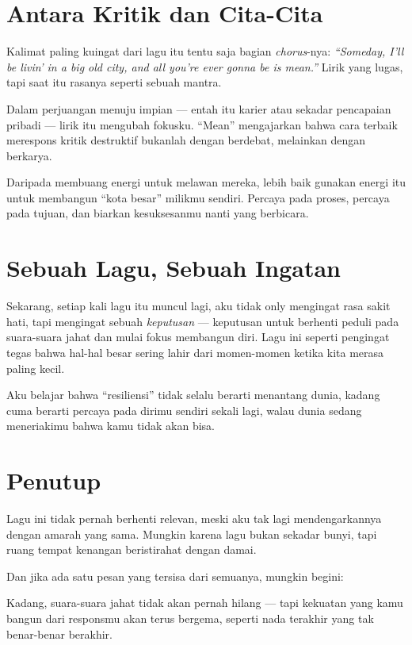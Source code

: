 \documentclass[
  letterpaper,
  DIV=11,
  numbers=noendperiod]{scrreprt}
\begin{document}
\section{Antara Kritik dan Cita-Cita}\label{antara-kritik-dan-cita-cita}

Kalimat paling kuingat dari lagu itu tentu saja bagian
\emph{chorus}-nya: \emph{``Someday, I'll be livin' in a big old city,
and all you're ever gonna be is mean.''} Lirik yang lugas, tapi saat itu
rasanya seperti sebuah mantra.

Dalam perjuangan menuju impian --- entah itu karier atau sekadar
pencapaian pribadi --- lirik itu mengubah fokusku. ``Mean'' mengajarkan
bahwa cara terbaik merespons kritik destruktif bukanlah dengan berdebat,
melainkan dengan berkarya.

Daripada membuang energi untuk melawan mereka, lebih baik gunakan energi
itu untuk membangun ``kota besar'' milikmu sendiri. Percaya pada proses,
percaya pada tujuan, dan biarkan kesuksesanmu nanti yang berbicara.

\section{Sebuah Lagu, Sebuah Ingatan}\label{sebuah-lagu-sebuah-ingatan}

Sekarang, setiap kali lagu itu muncul lagi, aku tidak only mengingat
rasa sakit hati, tapi mengingat sebuah \emph{keputusan} --- keputusan
untuk berhenti peduli pada suara-suara jahat dan mulai fokus membangun
diri. Lagu ini seperti pengingat tegas bahwa hal-hal besar sering lahir
dari momen-momen ketika kita merasa paling kecil.

Aku belajar bahwa ``resiliensi'' tidak selalu berarti menantang dunia,
kadang cuma berarti percaya pada dirimu sendiri sekali lagi, walau dunia
sedang meneriakimu bahwa kamu tidak akan bisa.

\section{Penutup}\label{penutup}

Lagu ini tidak pernah berhenti relevan, meski aku tak lagi
mendengarkannya dengan amarah yang sama. Mungkin karena lagu bukan
sekadar bunyi, tapi ruang tempat kenangan beristirahat dengan damai.

Dan jika ada satu pesan yang tersisa dari semuanya, mungkin begini:

Kadang, suara-suara jahat tidak akan pernah hilang --- tapi kekuatan
yang kamu bangun dari responsmu akan terus bergema, seperti nada
terakhir yang tak benar-benar berakhir.
\end{document}

